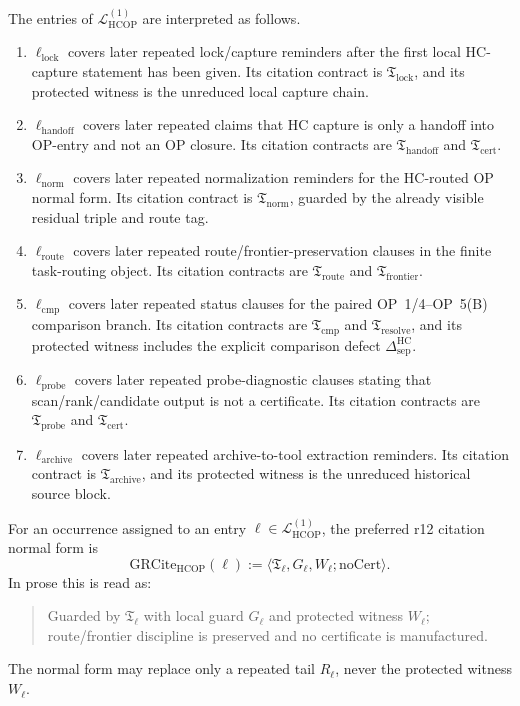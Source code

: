 \begin{definition}
\label{def:r12-guarded-citation-sites}
The entries of \(\mathcal L_{\mathrm{HCOP}}^{(1)}\) are interpreted as follows.
\begin{enumerate}[leftmargin=2em,label=(\roman*)]
  \item \(\ell_{\mathrm{lock}}\) covers later repeated lock/capture reminders after the first local HC-capture statement has been given.  Its citation contract is \(\mathfrak T_{\mathrm{lock}}\), and its protected witness is the unreduced local capture chain.
  \item \(\ell_{\mathrm{handoff}}\) covers later repeated claims that HC capture is only a handoff into OP-entry and not an OP closure.  Its citation contracts are \(\mathfrak T_{\mathrm{handoff}}\) and \(\mathfrak T_{\mathrm{cert}}\).
  \item \(\ell_{\mathrm{norm}}\) covers later repeated normalization reminders for the HC-routed OP normal form.  Its citation contract is \(\mathfrak T_{\mathrm{norm}}\), guarded by the already visible residual triple and route tag.
  \item \(\ell_{\mathrm{route}}\) covers later repeated route/frontier-preservation clauses in the finite task-routing object.  Its citation contracts are \(\mathfrak T_{\mathrm{route}}\) and \(\mathfrak T_{\mathrm{frontier}}\).
  \item \(\ell_{\mathrm{cmp}}\) covers later repeated status clauses for the paired OP~1/4--OP~5(B) comparison branch.  Its citation contracts are \(\mathfrak T_{\mathrm{cmp}}\) and \(\mathfrak T_{\mathrm{resolve}}\), and its protected witness includes the explicit comparison defect \(\Delta_{\mathrm{sep}}^{\mathrm{HC}}\).
  \item \(\ell_{\mathrm{probe}}\) covers later repeated probe-diagnostic clauses stating that scan/rank/candidate output is not a certificate.  Its citation contracts are \(\mathfrak T_{\mathrm{probe}}\) and \(\mathfrak T_{\mathrm{cert}}\).
  \item \(\ell_{\mathrm{archive}}\) covers later repeated archive-to-tool extraction reminders.  Its citation contract is \(\mathfrak T_{\mathrm{archive}}\), and its protected witness is the unreduced historical source block.
\end{enumerate}
\end{definition}

\begin{definition}
\label{def:ledger-citation-normal-form}
For an occurrence assigned to an entry \(\ell\in\mathcal L_{\mathrm{HCOP}}^{(1)}\), the preferred r12 citation normal form is
\[
  \mathrm{GRCite}_{\mathrm{HCOP}}(\ell)
  :=
  \langle \mathfrak T_{\ell},G_{\ell},W_{\ell};\mathrm{noCert}\rangle.
\]
In prose this is read as:
\begin{quote}\small
Guarded by \(\mathfrak T_{\ell}\) with local guard \(G_{\ell}\) and protected witness \(W_{\ell}\); route/frontier discipline is preserved and no certificate is manufactured.
\end{quote}
The normal form may replace only a repeated tail \(R_{\ell}\), never the protected witness \(W_{\ell}\).
\end{definition}

